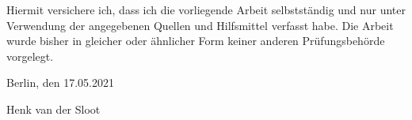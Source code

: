 
Hiermit versichere ich, dass ich die vorliegende Arbeit selbstständig und nur unter Verwendung der angegebenen Quellen und Hilfsmittel verfasst habe. Die Arbeit wurde bisher in gleicher oder ähnlicher Form keiner anderen Prüfungsbehörde vorgelegt.

\vskip 1cm

Berlin, den 17.05.2021

\vskip 1.5cm

Henk van der Sloot

